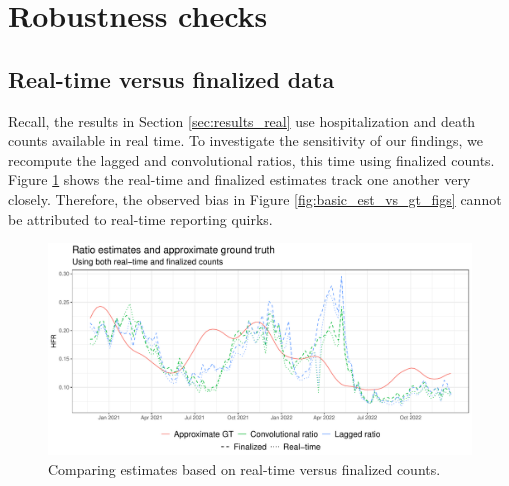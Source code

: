 \documentclass{article}
\begin{document}
\section{Robustness checks}
\label{apx:robustness}

\subsection{Real-time versus finalized data}

Recall, the results in Section \ref{sec:results_real} use hospitalization and
death counts available in real time. To investigate the sensitivity of our
findings, we recompute the lagged and convolutional ratios, this time using
finalized counts. Figure \ref{fig:rt_and_final} shows the real-time and
finalized estimates track one another very closely. Therefore, the observed bias
in Figure \ref{fig:basic_est_vs_gt_figs} cannot be attributed to real-time
reporting quirks.  


\begin{figure}[htb]
\includegraphics[width=\linewidth]{Figures/Real/US_ests_realtime_both.pdf}
\caption{Comparing estimates based on real-time versus finalized counts.}    
\label{fig:rt_and_final}
\end{figure}
\end{document}
